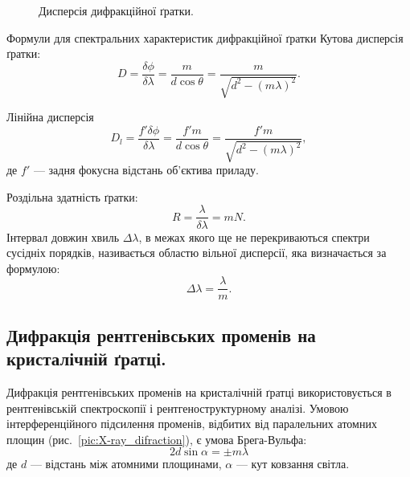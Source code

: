 \begin{figure}[h!]\centering
    
    \caption{Дисперсія дифракційної ґратки.}
    \label{pic:slotd_dispersion}
\end{figure}

\begin{Theory}{Формули для спектральних характеристик дифракційної ґратки}
    Кутова дисперсія ґратки:
    \begin{equation}\label{eq:Difraction_angular_dispersion}
        D = \frac{\delta\phi}{\delta\lambda} = \frac{m}{d\cos\theta} = \frac{m}{\sqrt{d^2 - (m\lambda)^2}}.
    \end{equation}

    Лінійна дисперсія
    \begin{equation}\label{eq:Difraction_linear_dispersion}
        D_l = \frac{f'\delta\phi}{\delta\lambda} = \frac{f'm}{d\cos\theta} = \frac{f'm}{\sqrt{d^2 - (m\lambda)^2}},
    \end{equation}
    де $f'$ --- задня фокусна відстань об'єктива приладу.

    Роздільна здатність ґратки:
    \begin{equation}\label{eq:Difraction_Slots_resolution}
        R = \frac{\lambda}{\delta\lambda} = mN.
    \end{equation}
    Інтервал довжин хвиль $\Delta\lambda$, в межах якого ще не перекриваються спектри сусідніх порядків, називається областю вільної дисперсії, яка визначається за формулою:
    \begin{equation}\label{eq:Difraction_free_dispersion}
        \Delta\lambda = \frac{\lambda}{m}.
    \end{equation}
\end{Theory}




\subsection*{Дифракція рентгенівських променів на кристалічній ґратці.}


Дифракція рентгенівських променів на кристалічній ґратці
використовується в рентгенівській спектроскопії і рентгеноструктурному
аналізі. Умовою інтерференційного підсилення променів, відбитих від
паралельних атомних площин (рис.~\ref{pic:X-ray_difraction}), є умова Брега-Вульфа:
\begin{equation}\label{eq:Brag-Wolf}
    2d\sin\alpha = \pm m\lambda
\end{equation}
де $d$ --- відстань між атомними площинами, $\alpha$ --- кут ковзання світла.


